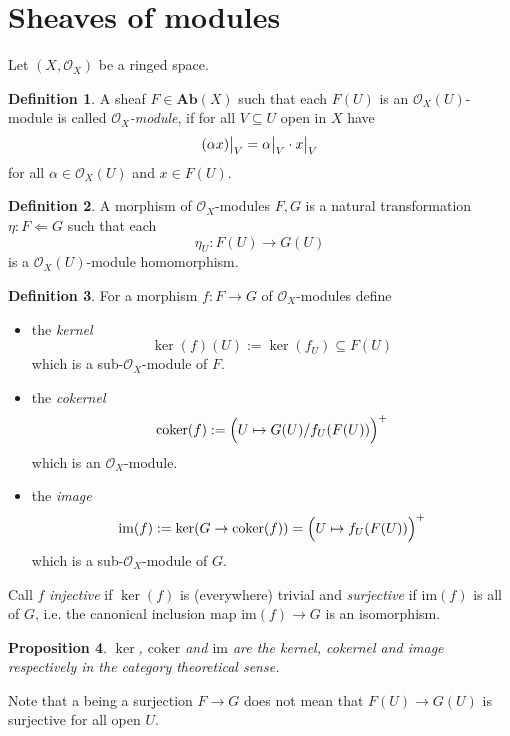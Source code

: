 \documentclass{scrartcl}
\newcommand{\Ab}{\mathrm{\textbf{Ab}}}
\newcommand{\im}{\mathrm{im}}
\renewcommand{\O}{\mathcal{O}}
\newcommand\restr[2]{{
    \left.\kern-\nulldelimiterspace
    #1
    \vphantom{\big|}
    \right|_{#2}
}}
\newtheorem{prop}{Proposition}[section]
\theoremstyle{definition}
\newtheorem{definition}[prop]{Definition}
\begin{document}
\section{Sheaves of modules}
Let $(X, \O_X)$ be a ringed space.
\begin{definition}
    A sheaf $F \in \Ab(X)$ such that each $F(U)$ is an $\O_X(U)$-module is called \emph{$\O_X$-module}, if for all $V \subseteq U$ open in $X$ have
    \begin{equation*}
        \restr{(\alpha x)}{V} = \restr{\alpha}{V} \cdot \restr{x}{V}
    \end{equation*}
    for all $\alpha \in \O_X(U)$ and $x \in F(U)$.
\end{definition}
\begin{definition}
    A morphism of $\O_X$-modules $F, G$ is a natural transformation $\eta: F \Leftarrow G$ such that each
    \begin{equation*}
        \eta_U: F(U) \to G(U)
    \end{equation*}
    is a $\O_X(U)$-module homomorphism.
\end{definition}
\begin{definition}
    For a morphism $f: F \to G$ of $\O_X$-modules define
    \begin{itemize}
        \item the \emph{kernel}
        \begin{equation*}
            \ker(f)(U) := \ker(f_U) \subseteq F(U)
        \end{equation*}
        which is a sub-$\O_X$-module of $F$.
        \item the \emph{cokernel}
        \begin{equation*}
            \mathrm{coker}(f) := \Bigl( U \mapsto G(U) / f_U(F(U)) \Bigr)^+
        \end{equation*}
        which is an $\O_X$-module.
        \item the \emph{image}
        \begin{equation*}
            \im(f) := \ker(G \to \mathrm{coker}(f)) = \Bigl( U \mapsto f_U(F(U)) \Bigr)^+
        \end{equation*}
        which is a sub-$\O_X$-module of $G$.
    \end{itemize}
    Call $f$ \emph{injective} if $\ker(f)$ is (everywhere) trivial and \emph{surjective} if $\im(f)$ is all of $G$, i.e. the canonical inclusion map $\im(f) \to G$ is an isomorphism.
\end{definition}
\begin{prop}
    $\ker$, $\mathrm{coker}$ and $\im$ are the kernel, cokernel and image respectively in the category theoretical sense.
\end{prop}
Note that a being a surjection $F \to G$ does not mean that $F(U) \to G(U)$ is surjective for all open $U$. 
\end{document}
